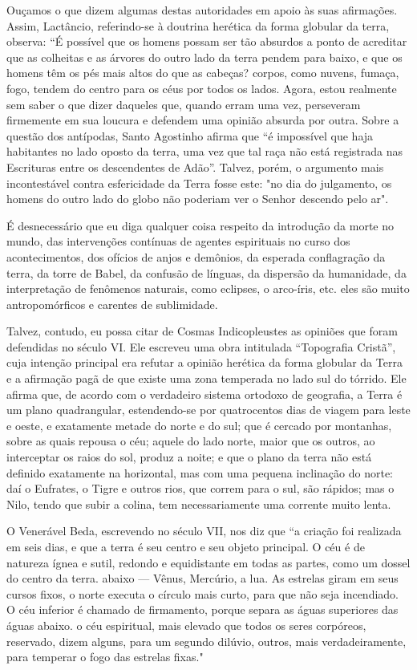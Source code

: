 \documentclass[11pt,a5paper,twoside,openany]{book}
\begin{document}
Ouçamos o que dizem algumas destas autoridades em apoio às suas afirmações. Assim, Lactâncio, referindo-se à doutrina herética da forma globular da terra, observa: “É possível que os homens possam ser tão absurdos a ponto de acreditar que as colheitas e as árvores do outro lado da terra pendem para baixo, e que os homens têm os pés mais altos do que as cabeças? corpos, como nuvens, fumaça, fogo, tendem do centro para os céus por todos os lados. Agora, estou realmente sem saber o que dizer daqueles que, quando erram uma vez, perseveram firmemente em sua loucura e defendem uma opinião absurda por outra. Sobre a questão dos antípodas, Santo Agostinho afirma que “é impossível que haja habitantes no lado oposto da terra, uma vez que tal raça não está registrada nas Escrituras entre os descendentes de Adão”. Talvez, porém, o argumento mais incontestável contra esfericidade da Terra fosse este: "no dia do julgamento, os homens do outro lado do globo não poderiam ver o Senhor descendo pelo ar".

É desnecessário que eu diga qualquer coisa respeito da introdução da morte no mundo, das intervenções contínuas de agentes espirituais no curso dos acontecimentos, dos ofícios de anjos e demônios, da esperada conflagração da terra, da torre de Babel, da confusão de línguas, da dispersão da humanidade, da interpretação de fenômenos naturais, como eclipses, o arco-íris, etc. eles são muito antropomórficos e carentes de sublimidade.

Talvez, contudo, eu possa citar de Cosmas Indicopleustes as opiniões que foram defendidas no século VI. Ele escreveu uma obra intitulada “Topografia Cristã”, cuja intenção principal era refutar a opinião herética da forma globular da Terra e a afirmação pagã de que existe uma zona temperada no lado sul do tórrido. Ele afirma que, de acordo com o verdadeiro sistema ortodoxo de geografia, a Terra é um plano quadrangular, estendendo-se por quatrocentos dias de viagem para leste e oeste, e exatamente metade do norte e do sul; que é cercado por montanhas, sobre as quais repousa o céu; aquele do lado norte, maior que os outros, ao interceptar os raios do sol, produz a noite; e que o plano da terra não está definido exatamente na horizontal, mas com uma pequena inclinação do norte: daí o Eufrates, o Tigre e outros rios, que correm para o sul, são rápidos; mas o Nilo, tendo que subir a colina, tem necessariamente uma corrente muito lenta.

O Venerável Beda, escrevendo no século VII, nos diz que “a criação foi realizada em seis dias, e que a terra é seu centro e seu objeto principal. O céu é de natureza ígnea e sutil, redondo e equidistante em todas as partes, como um dossel do centro da terra. abaixo — Vênus, Mercúrio, a lua. As estrelas giram em seus cursos fixos, o norte executa o círculo mais curto, para que não seja incendiado. O céu inferior é chamado de firmamento, porque separa as águas superiores das águas abaixo. o céu espiritual, mais elevado que todos os seres corpóreos, reservado, dizem alguns, para um segundo dilúvio, outros, mais verdadeiramente, para temperar o fogo das estrelas fixas."
\end{document}
